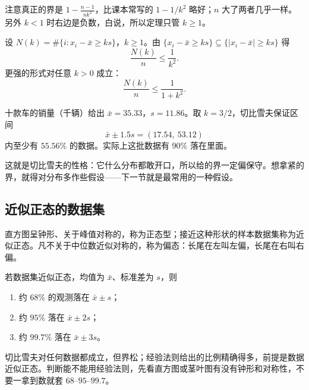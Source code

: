 注意真正的界是 $1-\frac{n-1}{nk^{2}}$，比课本常写的 $1-1/k^{2}$ 略好；$n$ 大了两者几乎一样。另外 $k<1$ 时右边是负数，白说，所以定理只管 $k\ge1$。

\begin{proposition}[单边版本]
设 $N(k)=\#\{i:x_i-\bar x\ge ks\}$，$k\ge1$。由 $\{x_i-\bar x\ge ks\}\subseteq\{|x_i-\bar x|\ge ks\}$ 得
\[
\frac{N(k)}{n}\le\frac{1}{k^{2}} .
\]
更强的形式对任意 $k>0$ 成立：
\[
\frac{N(k)}{n}\le\frac{1}{1+k^{2}} .
\]
\end{proposition}

\begin{example}[2013 年 6 月畅销车型]
十款车的销量（千辆）给出 $\bar x=35.33$，$s=11.86$。取 $k=3/2$，切比雪夫保证区间
\[
\bar x\pm1.5s=(17.54,\ 53.12)
\]
内至少有 $55.56\%$ 的数据。实际上这批数据有 $90\%$ 落在里面。
\end{example}

这就是切比雪夫的性格：它什么分布都敢开口，所以给的界一定偏保守。想拿紧的界，就得对分布多作些假设——下一节就是最常用的一种假设。

\subsection{近似正态的数据集}

\begin{definition}[正态数据集与偏态]
直方图呈钟形、关于峰值对称的，称为正态型；接近这种形状的样本数据集称为近似正态。凡不关于中位数近似对称的，称为偏态：长尾在左叫左偏，长尾在右叫右偏。
\end{definition}

\begin{theorem}[经验法则]
若数据集近似正态，均值为 $\bar x$、标准差为 $s$，则
\begin{enumerate}
 \item 约 $68\%$ 的观测落在 $\bar x\pm s$；
 \item 约 $95\%$ 落在 $\bar x\pm2s$；
 \item 约 $99.7\%$ 落在 $\bar x\pm3s$。
\end{enumerate}
\end{theorem}

\begin{proposition}[两个工具的分工]
切比雪夫对任何数据都成立，但界松；经验法则给出的比例精确得多，前提是数据近似正态。判断能不能用经验法则，先看直方图或茎叶图有没有钟形和对称性，不要一拿到数就套 $68$--$95$--$99.7$。
\end{proposition}

